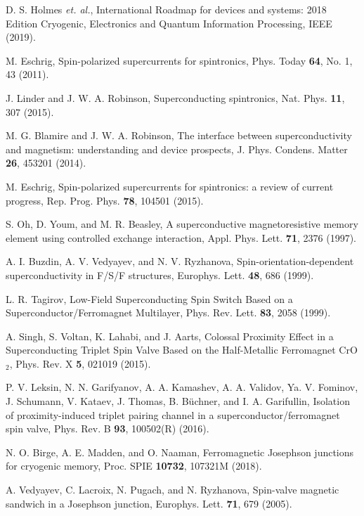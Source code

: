 \documentclass[prb,amsmath,amssymb,reprint]{revtex4-2}
\begin{document}
\begin{thebibliography}{99}

 D. S. Holmes {\em et. al.},
International Roadmap for devices and systems: 2018 Edition Cryogenic,
Electronics and Quantum Information Processing, IEEE (2019).


 M. Eschrig, Spin-polarized supercurrents for spintronics, Phys. Today \textbf{64}, No. 1, 43 (2011).

 J. Linder and J. W. A. Robinson, Superconducting spintronics, Nat. Phys. \textbf{11}, 307 (2015).

 M. G. Blamire and J. W. A. Robinson, The interface between superconductivity and magnetism: understanding and device prospects, J. Phys. Condens. Matter \textbf{26}, 453201 (2014).

 M. Eschrig, Spin-polarized supercurrents for spintronics: a review of current progress, Rep. Prog. Phys. \textbf{78}, 104501 (2015).


 S. Oh, D. Youm, and M. R. Beasley, A superconductive magnetoresistive memory element using controlled exchange interaction,
Appl. Phys. Lett. \textbf{71}, 2376 (1997).

 A. I. Buzdin, A. V. Vedyayev, and N. V. Ryzhanova,
Spin-orientation-dependent superconductivity in F/S/F structures,
Europhys. Lett. \textbf{48}, 686 (1999).

 L. R. Tagirov,
Low-Field Superconducting Spin Switch Based on a Superconductor/Ferromagnet Multilayer, Phys. Rev. Lett. \textbf{83}, 2058 (1999).

 A. Singh, S. Voltan, K. Lahabi, and J. Aarts,
Colossal Proximity Effect in a Superconducting Triplet Spin Valve Based on the Half-Metallic Ferromagnet CrO$_2$,
 Phys. Rev.
X \textbf{5}, 021019 (2015).

 P. V. Leksin, N. N. Garifyanov, A. A. Kamashev, A.
A. Validov, Ya. V. Fominov, J. Schumann, V. Kataev, J. Thomas, B. B\"{u}chner, and I. A. Garifullin,
Isolation of proximity-induced triplet pairing channel in a superconductor/ferromagnet spin valve,
Phys. Rev. B \textbf{93}, 100502(R) (2016).

 N. O. Birge, A. E. Madden, and O. Naaman,
Ferromagnetic Josephson junctions for cryogenic memory,
Proc. SPIE \textbf{10732}, 107321M (2018).

 A. Vedyayev, C. Lacroix, N. Pugach, and N. Ryzhanova,
Spin-valve magnetic sandwich in a Josephson junction,
Europhys. Lett. \textbf{71}, 679 (2005).


\end{thebibliography}
\end{document}
